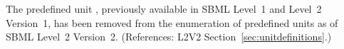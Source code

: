 The predefined unit , previously available in SBML
Level~1 and Level~2 Version~1, has been removed from the
 enumeration of predefined units as of SBML Level~2
Version~2.  (References: L2V2 Section~\ref{sec:unitdefinitions}.)
